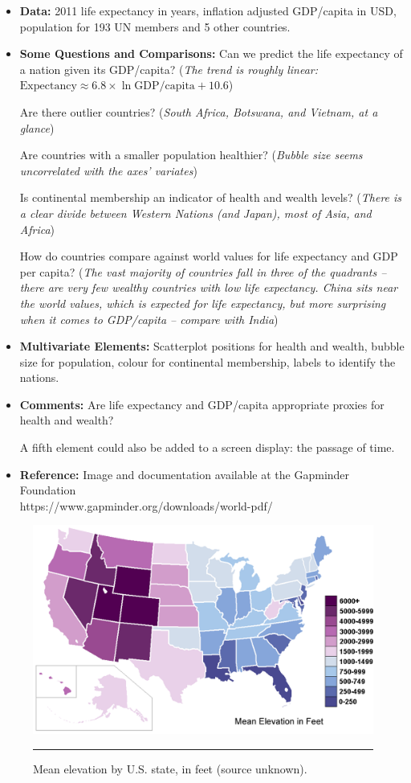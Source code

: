\begin{itemize}[noitemsep]
\item \textbf{Data:} 2011 life expectancy in years, inflation adjusted GDP/capita in USD, population for 193 UN members and 5 other countries. 
\item \textbf{Some Questions and Comparisons:} Can we predict the life expectancy of a nation given its GDP/capita? (\textit{The trend is roughly linear: $\mbox{Expectancy}\approx 6.8 \times \ln \mbox{GDP/capita} + 10.6$}) \par Are there outlier countries? (\textit{South Africa, Botswana, and Vietnam, at a glance})\par Are countries with a smaller population healthier? (\textit{Bubble size seems uncorrelated with the axes' variates}) \par Is continental membership an indicator of health and wealth levels? (\textit{There is a clear divide between Western Nations (and Japan), most of Asia, and Africa}) \par How do countries  compare against world values for life expectancy and GDP per capita? (\textit{The vast majority of countries fall in three of the quadrants -- there are very few wealthy countries with low life expectancy. China sits near the world values, which is expected for life expectancy, but more surprising when it comes to GDP/capita -- compare with India})   
\item \textbf{Multivariate Elements:} Scatterplot positions for health and wealth, bubble size for population, colour for continental membership, labels to identify the nations. 
\item \textbf{Comments:} Are life expectancy and GDP/capita appropriate proxies for health and wealth? \par A fifth element could also be added to a screen display: the passage of time. 
\item \textbf{Reference:} Image and documentation available at the Gapminder Foundation \\ https://www.gapminder.org/downloads/world-pdf/
\end{itemize}
\newpage
\begin{figure}[H]
\centering
\includegraphics[width=\textwidth]{images/DV/choropleth.png}
\caption[\small Choropleth Map: mean elevation by U.S. state ]{\small Mean elevation by U.S. state, in feet (source unknown).} \hrule\label{fig:ex_ch_mef}
\end{figure}
